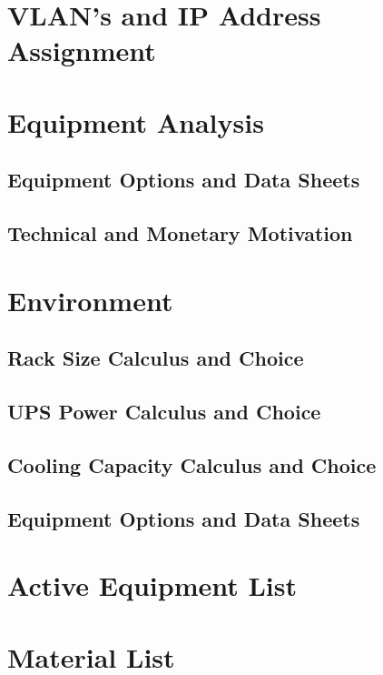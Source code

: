 \documentclass[12pt]{report}
\begin{document}
\chapter{VLAN's and IP Address Assignment}

\chapter{Equipment Analysis}

\section{Equipment Options and Data Sheets}

\section{Technical and Monetary Motivation}

\chapter{Environment}

\section{Rack Size Calculus and Choice}

\section{UPS Power Calculus and Choice}

\section{Cooling Capacity Calculus and Choice}

\section{Equipment Options and Data Sheets}

\chapter{Active Equipment List}

\chapter{Material List}
\end{document}
